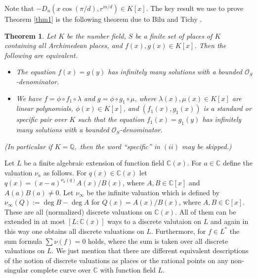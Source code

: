 \documentclass[12pt]{amsart}
\newtheorem{theorem}{Theorem}[section]
\newcommand{\Q}{\mbox{$\mathbb Q$}}
\newcommand{\C}{\mbox{$\mathbb C$}}     %
\begin{document}
Note that $-D_n(x\cos(\pi/d), r^{m/d}) \in K[x]$. The key result we use to prove Theorem \ref{thm1} is the following theorem due to Bilu and Tichy \cite[Theorem 10.5]{bilu2000diophantine}.
	\begin{theorem}\label{biluthm}
		Let $K$ be the number field, $S$ be a finite set of places of $K$ containing all Archimedean places, and $f(x),g(x)\in K[x]$. Then the following are equivalent.
		\begin{itemize}
			\item[(i)] The equation $f(x) = g(y)$ has infinitely many solutions with a bounded $\mathcal{O}_S$-denominator.
			\item[(ii)] We have $f=\phi \circ f_1\circ \lambda$ and $g=\phi\circ g_1\circ \mu$, where $\lambda(x),\mu(x)\in K[x]$ are linear polynomials, $\phi(x)\in K[x]$, and $(f_1(x),g_1(x))$ is a standard or specific pair over $K$ such that the equation $f_1(x) = g_1(y)$ has infinitely many solutions with a bounded $\mathcal{O}_S$-denominator.
		\end{itemize}
        (In particular if $K=\Q,$ then the word ``specific'' in $(ii)$ may be skipped.)
	\end{theorem}

      Let $L$ be a finite algebraic extension of function field $\C(x)$. For $a\in \C$ define the valuation $\nu_a$ as follows. For $q(x)\in \C(x)$ let $q(x)=(x-a)^{\nu_a(q)}A(x)/B(x)$, where $A,B\in \C[x]$ and $A(a)B(a)\neq 0$. Let $\nu_{\infty}$ be the infinite valuation which is defined by $\nu_{\infty}(Q):=\deg B-\deg A$ for $Q(x)=A(x)/B(x)$, where $A,B\in \C[x]$. These are all (normalized) discrete valuations on $\C(x)$. All of them can be extended in at most $[L:\C(x)]$ ways to a discrete valutaion on $L$ and again in this way one obtains all discrete valuations on $L$. Furthermore, for $f\in L^{*}$ the sum formula $\sum \nu(f)=0$ holds, where the sum is taken over all discrete valuations on $L$.  We just mention that there are different equivalent descriptions of the notion of discrete valuations as places or the rational points on any non-singular complete curve over $\C$ with function field $L$. 
      
\end{document}
